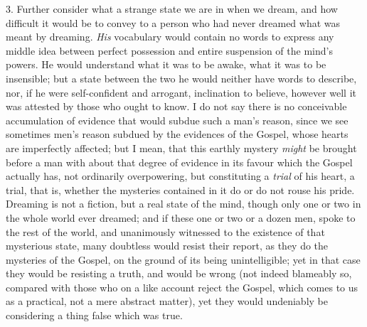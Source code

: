 3. Further consider what a strange state we are in when we dream,
and how difficult it would be to convey to a person who had never
dreamed what was meant by dreaming. \emph{His} vocabulary would
contain no words to express any middle idea between perfect possession
and entire suspension of the mind's powers. He would understand what
it was to be awake, what it was to be insensible; but a state between
the two he would neither have words to describe, nor, if he were
self-confident and arrogant, inclination to believe, however well it
was attested by those who ought to know. I do not say there is no
conceivable accumulation of evidence that would subdue such a man's
reason, since we see sometimes men's reason subdued by the evidences
of the Gospel, whose hearts are imperfectly affected; but I mean, that
this earthly mystery \emph{might} be brought before a man with about
that degree of evidence in its favour which the Gospel actually has,
not ordinarily overpowering, but constituting a \emph{trial} of his
heart, a trial, that is, whether the mysteries contained in it do or
do not rouse his pride. Dreaming is not a fiction, but a real state of
the mind, though only one or two in the whole world ever dreamed; and
if these one or two or a dozen men, spoke to the rest of the world,
and unanimously witnessed to the existence of that mysterious state,
many doubtless would resist their report, as they do the mysteries of
the Gospel, on the ground of its being unintelligible; yet in that
case they would be resisting a truth, and would be wrong (not indeed
blameably so, compared with those who on a like account reject the
Gospel, which comes to us as a practical, not a mere abstract matter),
yet they would undeniably be considering a thing false which was true.

